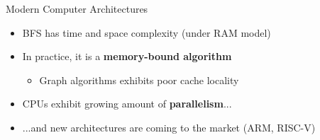 \begin{frame}{Modern Computer Architectures}
\begin{itemize}
    \item<1-> BFS has  time and space complexity (under RAM model)
    \item<2-> In practice, it is a \textbf{memory-bound algorithm} %
    \begin{itemize}
        \item Graph algorithms exhibits poor cache locality
    \end{itemize}
    \item<3-> CPUs exhibit growing amount of \textbf{parallelism}...
    \item<4-> ...and new architectures are coming to the market (ARM, RISC-V)
\end{itemize}
\end{frame}


